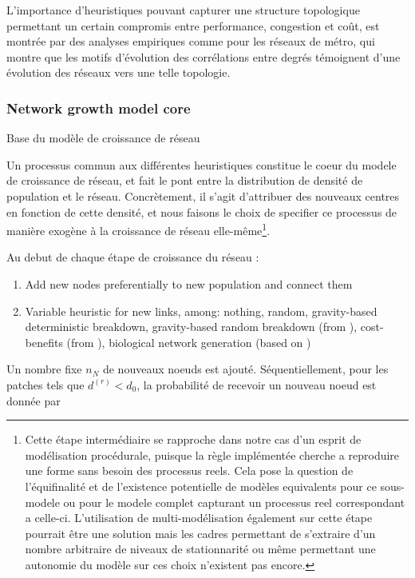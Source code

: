 L'importance d'heuristiques pouvant capturer une structure topologique permettant un certain compromis entre performance, congestion et coût, est montrée par des analyses empiriques comme \cite{2012arXiv1202.1747W} pour les réseaux de métro, qui montre que les motifs d'évolution des corrélations entre degrés témoignent d'une évolution des réseaux vers une telle topologie.



\subsubsection{Network growth model core}{Base du modèle de croissance de réseau}


Un processus commun aux différentes heuristiques constitue le coeur du modele de croissance de réseau, et fait le pont entre la distribution de densité de population et le réseau. Concrètement, il s'agit d'attribuer des nouveaux centres en fonction de cette densité, et nous faisons le choix de specifier ce processus de manière exogène à la croissance de réseau elle-même\footnote{Cette étape intermédiaire se rapproche dans notre cas d'un esprit de modélisation procédurale, puisque la règle implémentée cherche a reproduire une forme sans besoin des processus reels. Cela pose la question de l'équifinalité et de l'existence potentielle de modèles equivalents pour ce sous-modele ou pour le modele complet capturant un processus reel correspondant a celle-ci. L'utilisation de multi-modélisation également sur cette étape pourrait être une solution mais les cadres permettant de s'extraire d'un nombre arbitraire de niveaux de stationnarité ou même permettant une autonomie du modèle sur ces choix n'existent pas encore.}.


Au debut de chaque étape de croissance du réseau :

\begin{enumerate}
	\item Add new nodes preferentially to new population and connect them
	\item Variable heuristic for new links, among: nothing, random, gravity-based deterministic breakdown, gravity-based random breakdown (from \cite{schmitt2014modelisation}), cost-benefits (from \cite{louf2013emergence}), biological network generation (based on \cite{tero2010rules})
\end{enumerate}

Un nombre fixe $n_N$ de nouveaux noeuds est ajouté. Séquentiellement, pour les patches tels que $d^{(r)} < d_0$, la probabilité de recevoir un nouveau noeud est donnée par

